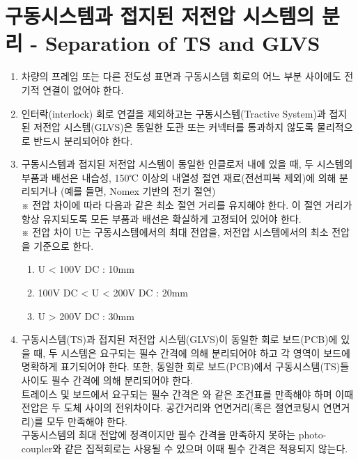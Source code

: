 \documentclass[final,a4paper,10pt]{report}
\begin{document}
\section{구동시스템과 접지된 저전압 시스템의 분리 - Separation of TS and GLVS}\label{rule:formula-technical.ts-glvs-separation}
\begin{enumerate}
  \item\label{rule:formula-technical.ts-glvs-separation.no-connection-to-frame} 차량의 프레임 또는 다른 전도성 표면과 구동시스템 회로의 어느 부분 사이에도 전기적 연결이 없어야 한다.
  \item\label{rule:formula-technical.ts-glvs-separation.separate-conduits-except-interlock} 인터락(interlock) 회로 연결을 제외하고는 구동시스템(Tractive System)과 접지된 저전압 시스템(GLVS)은 동일한 도관 또는 커넥터를 통과하지 않도록 물리적으로 반드시 분리되어야 한다.
  \item\label{rule:formula-technical.ts-glvs-separation.min-separation-distance} 구동시스템과 접지된 저전압 시스템이 동일한 인클로저 내에 있을 때, 두 시스템의 부품과 배선은 내습성, 150℃ 이상의 내열성 절연 재료(전선피복 제외)에 의해 분리되거나 (예를 들면, Nomex 기반의 전기 절연) \\
  ※ 전압 차이에 따라 다음과 같은 최소 절연 거리를 유지해야 한다. 이 절연 거리가 항상 유지되도록 모든 부품과 배선은 확실하게 고정되어 있어야 한다. \\
  ※ 전압 차이 U는 구동시스템에서의 최대 전압을, 저전압 시스템에서의 최소 전압을 기준으로 한다.
    \begin{enumerate}
      \item\label{rule:formula-technical.ts-glvs-separation.min-separation-distance.under-100v-10mm} U < 100V DC : 10mm
      \item\label{rule:formula-technical.ts-glvs-separation.min-separation-distance.range-100to200v-20mm} 100V DC < U < 200V DC : 20mm
      \item\label{rule:formula-technical.ts-glvs-separation.min-separation-distance.over-200v-30mm} U > 200V DC : 30mm
    \end{enumerate}

  \item\label{rule:formula-technical.ts-glvs-separation.pcb-clearance-and-creepage} 구동시스템(TS)과 접지된 저전압 시스템(GLVS)이 동일한 회로 보드(PCB)에 있을 때, 두 시스템은 요구되는 필수 간격에 의해 분리되어야 하고 각 영역이 보드에 명확하게 표기되어야 한다. 또한, 동일한 회로 보드(PCB)에서 구동시스템(TS)들 사이도 필수 간격에 의해 분리되어야 한다.\\
    트레이스 및 보드에서 요구되는 필수 간격은 와 같은 조건표를 만족해야 하며 이때 전압은 두 도체 사이의 전위차이다. 공간거리와 연면거리(혹은 절연코팅시 연면거리)를 모두 만족해야 한다.\\
    구동시스템의 최대 전압에 정격이지만 필수 간격을 만족하지 못하는 photo-coupler와 같은 집적회로는 사용될 수 있으며 이때 필수 간격은 적용되지 않는다.


\end{enumerate}
\end{document}

